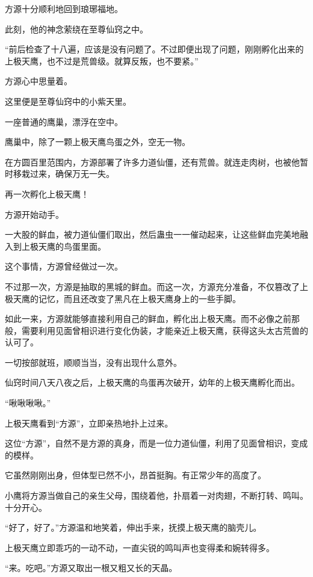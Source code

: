 
\begin{this_body}

方源十分顺利地回到琅琊福地。

此刻，他的神念萦绕在至尊仙窍之中。

“前后检查了十八遍，应该是没有问题了。不过即便出现了问题，刚刚孵化出来的上极天鹰，也不过是荒兽级。就算反叛，也不要紧。”

方源心中思量着。

这里便是至尊仙窍中的小紫天里。

一座普通的鹰巢，漂浮在空中。

鹰巢中，除了一颗上极天鹰鸟蛋之外，空无一物。

在方圆百里范围内，方源部署了许多力道仙僵，还有荒兽。就连走肉树，也被他暂时移栽过来，确保万无一失。

再一次孵化上极天鹰！

方源开始动手。

一大股的鲜血，被力道仙僵们取出，然后蛊虫一一催动起来，让这些鲜血完美地融入到上极天鹰的鸟蛋里面。

这个事情，方源曾经做过一次。

不过那一次，方源是抽取的黑城的鲜血。而这一次，方源充分准备，不仅篡改了上极天鹰的记忆，而且还改变了黑凡在上极天鹰身上的一些手脚。

如此一来，方源就能够直接利用自己的鲜血，孵化出上极天鹰。而不必像之前那般，需要利用见面曾相识进行变化伪装，才能亲近上极天鹰，获得这头太古荒兽的认可了。

一切按部就班，顺顺当当，没有出现什么意外。

仙窍时间八天八夜之后，上极天鹰的鸟蛋再次破开，幼年的上极天鹰孵化而出。

“啾啾啾啾。”

上极天鹰看到“方源”，立即亲热地扑上过来。

这位“方源”，自然不是方源的真身，而是一位力道仙僵，利用了见面曾相识，变成的模样。

它虽然刚刚出身，但体型已然不小，昂首挺胸。有正常少年的高度了。

小鹰将方源当做自己的亲生父母，围绕着他，扑扇着一对肉翅，不断打转、鸣叫。十分开心。

“好了，好了。”方源温和地笑着，伸出手来，抚摸上极天鹰的脑壳儿。

上极天鹰立即乖巧的一动不动，一直尖锐的鸣叫声也变得柔和婉转得多。

“来。吃吧。”方源又取出一根又粗又长的天晶。


\end{this_body}
